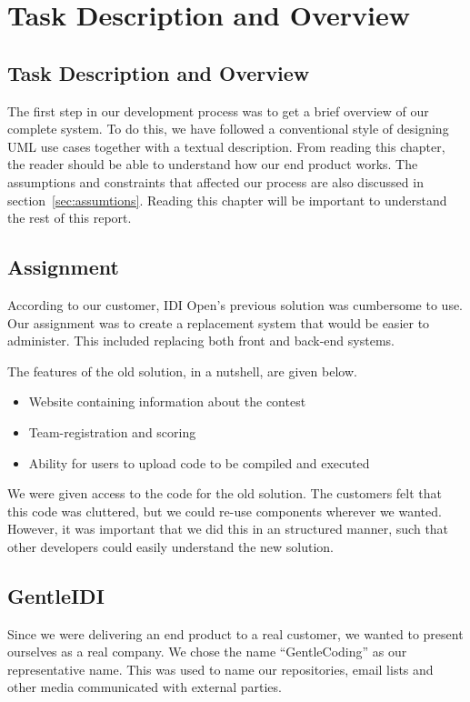 \chapter{Task Description and Overview}

\section{Task Description and Overview}
\label{sec:taskdesc}

The first step in our development process was to get a brief overview of
our complete system. To do this, we have followed a conventional style
of designing UML use cases together with a textual description. From
reading this chapter, the reader should be able to understand how our
end product works. The assumptions and constraints that affected our
process are also discussed in section~\ref{sec:assumtions}.
Reading this chapter will be important to
understand the rest of this report.

\section{Assignment}
According to our customer, IDI Open's previous solution was
cumbersome to use. Our assignment was to create a replacement system
that would be easier to administer.
This included replacing both front and back-end systems.

The features of the old solution, in a nutshell, are given below.
\begin{itemize}
\item Website containing information about the contest
\item Team-registration and scoring
\item Ability for users to upload code to be compiled and executed
\end{itemize}

We were given access to the code for the old solution. The customers
felt that this code was cluttered, but we could re-use components
wherever we wanted. However, it was important that we did this in an
structured manner, such that other developers could easily understand the
new solution.

\section{GentleIDI}

Since we were delivering an end product to a real customer, we wanted to
present ourselves as a real company. We chose the name
``GentleCoding'' as our
representative name. This was used to name our repositories, email
lists and other media communicated with external parties.

